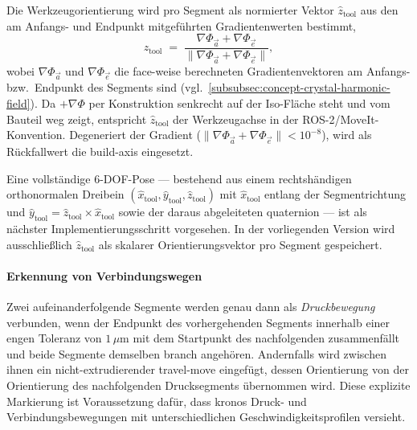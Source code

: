                 Die Werkzeugorientierung wird pro Segment als normierter Vektor $\hat{z}_\text{tool}$ aus den am Anfangs- und Endpunkt mitgeführten Gradientenwerten bestimmt,
                \begin{equation}
                    \hat{z}_\text{tool}
                    \;=\;
                    \frac{\nabla\Phi_{\vec{a}} + \nabla\Phi_{\vec{e}}}
                        {\lVert\nabla\Phi_{\vec{a}} + \nabla\Phi_{\vec{e}}\rVert},
                    \label{eq:concept-crystal-tool-frame}
                \end{equation}
                wobei $\nabla\Phi_{\vec{a}}$ und $\nabla\Phi_{\vec{e}}$ die face-weise berechneten Gradientenvektoren am Anfangs- bzw.\ Endpunkt des Segments sind (vgl.\ \cref{subsubsec:concept-crystal-harmonic-field}).
                Da $+\nabla\Phi$ per Konstruktion senkrecht auf der Iso-Fläche steht und vom Bauteil weg zeigt, entspricht $\hat{z}_\text{tool}$ der Werkzeugachse in der \ac{ROS}-2\slash{}MoveIt-Konvention.
                Degeneriert der Gradient ($\lVert\nabla\Phi_{\vec{a}} + \nabla\Phi_{\vec{e}}\rVert < 10^{-8}$), wird als Rückfallwert die \gls{build-axis} eingesetzt.

                Eine vollständige 6-\ac{DOF}-Pose — bestehend aus einem rechtshändigen orthonormalen Dreibein $(\hat{x}_\text{tool}, \hat{y}_\text{tool}, \hat{z}_\text{tool})$ mit $\hat{x}_\text{tool}$ entlang der Segmentrichtung und $\hat{y}_\text{tool} = \hat{z}_\text{tool} \times \hat{x}_\text{tool}$ sowie der daraus abgeleiteten \gls{quaternion} — ist als nächster Implementierungsschritt vorgesehen.
                In der vorliegenden Version wird ausschließlich $\hat{z}_\text{tool}$ als skalarer Orientierungsvektor pro Segment gespeichert.

                \paragraph{Erkennung von Verbindungswegen}
                    Zwei aufeinanderfolgende Segmente werden genau dann als \emph{Druckbewegung} verbunden, wenn der Endpunkt des vorhergehenden Segments innerhalb einer engen Toleranz von $1\,\mu\text{m}$ mit dem Startpunkt des nachfolgenden zusammenfällt und beide Segmente demselben \gls{branch} angehören.
                    Andernfalls wird zwischen ihnen ein nicht-extrudierender \gls{travel-move} eingefügt, dessen Orientierung von der Orientierung des nachfolgenden Drucksegments übernommen wird.
                    Diese explizite Markierung ist Voraussetzung dafür, dass \ac{kronos} Druck- und Verbindungsbewegungen mit unterschiedlichen Geschwindigkeitsprofilen versieht.

